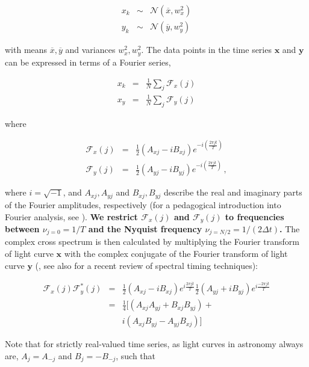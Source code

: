 \documentclass[12pt]{emulateapj}
\begin{document}
\begin{eqnarray}
x_k &\sim& \mathcal{N}(\overline{x}, w_x^2)  \nonumber \\
y_k &\sim& \mathcal{N}(\overline{y}, w_y^2) \nonumber
\end{eqnarray} 

\noindent with means $\overline{x}, \overline{y}$ and variances $w_x^2, w_y^2$. The data points in the time series $\mathbf{x}$ and $\mathbf{y}$ can be expressed in terms of a Fourier series,

\begin{eqnarray}
x_k & = & \frac{1}{N} \sum_{j}{\mathcal{F}_x(j)} \nonumber \\
x_y & = & \frac{1}{N} \sum_{j}{\mathcal{F}_y(j)}
\end{eqnarray}

\noindent where

\begin{eqnarray}
\mathcal{F}_x(j) &= & \frac{1}{2} (A_{xj} - i B_{xj}) e^{-i\left( \frac{2 \pi j t}{T} \right)} \\
\mathcal{F}_y(j) &= & \frac{1}{2} (A_{yj} - i B_{yj}) e^{-i\left( \frac{2 \pi j t}{T} \right)} \, ,
\end{eqnarray}

\noindent where $i = \sqrt{-1}$, and $A_{xj}, A_{yj}$ and $B_{xj}, B_{yj}$ describe the real and imaginary parts of the Fourier amplitudes, respectively (for a pedagogical introduction into Fourier analysis, see \citealt{vanderklis1989}). \textbf{We restrict $\mathcal{F}_x(j)$ and $\mathcal{F}_y(j)$ to frequencies between $\nu_{j=0} = 1/T$ and the Nyquist frequency $\nu_{j=N/2} = 1/(2\Delta t)$.}
The complex cross spectrum is then calculated by multiplying the Fourier transform of light curve $\mathbf{x}$ with the complex conjugate of the Fourier transform of light curve $\mathbf{y}$ (\citealt{vaughan1997,nowak1999}, see also \citealt{uttley2014} for a recent review of spectral timing techniques):

\begin{eqnarray}
\mathcal{F}_x(j) \mathcal{F}_y^*(j) & = & \frac{1}{2} (A_{xj} - i B_{xj}) e^{i \frac{2 \pi j t}{T}} \frac{1}{2} (A_{yj} + i B_{yj}) e^{i \frac{-2 \pi j t}{T}}\nonumber \\ 
		     & = & \frac{1}{4} [ (A_{xj}A_{yj} + B_{xj}B_{yj}) + \\\nonumber
		     & &  i (A_{xj}B_{yj} - A_{yj}B_{xj}) ]
\end{eqnarray}

Note that for strictly real-valued time series, as light curves in astronomy always are, $A_j = A_{-j}$ and $B_j = - B_{-j}$, such that 
\end{document}
